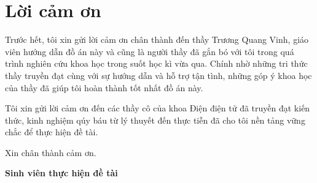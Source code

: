 \chapter*{Lời cảm ơn}
Trước hết, tôi xin gửi lời cảm ơn chân thành đến thầy Trương Quang Vinh,
giáo viên hướng dẫn đồ án này và cũng là người thầy đã gắn bó với tôi trong quá trình nghiên cứu khoa học trong suốt học kì vừa qua.
Chính nhờ những tri thức thầy truyền đạt cùng với sự hướng dẫn và hỗ trợ tận tình, những góp ý khoa học của thầy đã giúp tôi hoàn thành tốt nhất đồ án này.

Tôi xin gửi lời cảm ơn đến các thầy cô của khoa Điện điện tử đã truyền đạt kiến thức,
kinh nghiệm qúy báu từ lý thuyết đến thực tiễn đã cho tôi nền tảng vững chắc để thực hiện đề tài.

Xin chân thành cảm ơn.
\begin{flushright}
\textbf{Sinh viên thực hiện đề tài}
\end{flushright}
